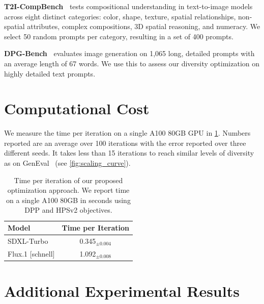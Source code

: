 \documentclass[10pt,twocolumn,letterpaper]{article}
\begin{document}
\noindent \textbf{T2I-CompBench~\cite{huang2023t2icompbench}} tests compositional understanding in text-to-image models across eight distinct categories: color, shape, texture, spatial relationships, non-spatial attributes, complex compositions, 3D spatial reasoning, and numeracy. We select 50 random prompts per category, resulting in a set of 400 prompts.

\noindent \textbf{DPG-Bench~\cite{hu2024ella}} evaluates image generation on 1,065 long, detailed prompts with an average length of 67 words. We use this to assess our diversity optimization on highly detailed text prompts.



\section{Computational Cost}\label{sec:supp_computational_cost}


We measure the time per iteration on a single A100 80GB GPU in \cref{tab:compute_iters}. Numbers reported are an average over 100 iterations with the error reported over three different seeds. It takes less than 15 iterations to reach similar levels of diversity as \citet{gi} on GenEval~\cite{ghosh2023geneval} (see \cref{fig:scaling_curve}).

\begin{table}[h]
\caption{Time per iteration of our proposed optimization approach. We report time on a single A100 80GB in seconds using DPP and HPSv2 objectives.}
\centering
\begin{tabular}{lc}
\toprule
\textbf{Model} &  \textbf{Time per Iteration}\\
\midrule
SDXL-Turbo & 0.345$_{\pm 0.004}$  \\
Flux.1 [schnell] & 1.092$_{\pm 0.008}$ \\
\bottomrule
\bottomrule
\end{tabular}
\label{tab:compute_iters}
\end{table}




\section{Additional Experimental Results}
\end{document}
